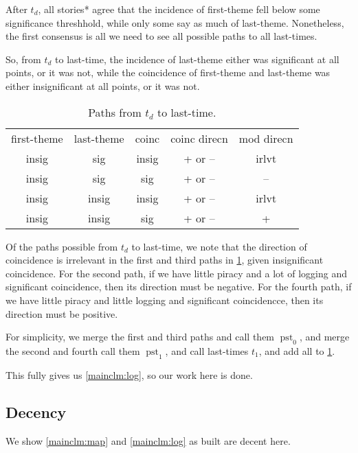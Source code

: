 \documentclass{amsart}
\DeclareMathOperator{\pst}{pst}%
\theoremstyle{definition}
\theoremstyle{remark}
\begin{document}
			After \(t_{d}\), all stories* agree that the incidence of first-theme fell below some significance threshhold, while only some say as much of last-theme. Nonetheless, the first consensus is all we need to see all possible paths to all last-times.
			
			So, from \(t_{d}\) to last-time, the incidence of last-theme either was significant at all points, or it was not, while the coincidence of first-theme and last-theme was either insignificant at all points, or it was not.
			\begin{table}
			\caption{Paths from \(t_{d}\) to last-time.}
			\label{tab:pathsforlog}
			\begin{tabular}{ccccc}
			first-theme &last-theme &coinc &coinc direcn	&mod direcn\\
			insig	&sig	&insig	&+ or --	&irlvt\\
			insig	&sig	&sig		&+ or --	&--\\
			insig	&insig	&insig	&+ or --	&irlvt\\
			insig	&insig	&sig		&+ or --	&+
			\end{tabular}
			\end{table}
			
			Of the paths possible from \(t_{d}\) to last-time, we note that the direction of coincidence is irrelevant in the first and third paths in \ref{tab:pathsforlog}, given insignificant coincidence. For the second path, if we have little piracy and a lot of logging and significant coincidence, then its direction must be negative. For the fourth path, if we have little piracy and little logging and significant coincidencce, then its direction must be positive.
			
			For simplicity, we merge the first and third paths and call them \(\pst_{0}\), and merge the second and fourth call them \(\pst_{1}\), and call last-times \(t_{1}\), and add all to \ref{tab:pathsforlog}. 
			
			This fully gives us \ref{mainclm:log}, so our work here is done.
	\subsection{Decency}
		\label{ss:decency}
		We show \ref{mainclm:map} and \ref{mainclm:log} as built are decent here.
		
%
%
%
\begin{bibdiv}
	\label{s:references}
	\begin{biblist}
	\end{biblist}
\end{bibdiv}
%
%
%
\end{document}
